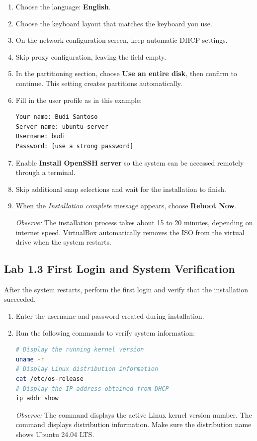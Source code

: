 \begin{enumerate}
    \item Choose the language: \textbf{English}.
    \item Choose the keyboard layout that matches the keyboard you use.
    \item On the network configuration screen, keep automatic DHCP settings.
    \item Skip proxy configuration, leaving the field empty.
    \item In the partitioning section, choose \textbf{Use an entire disk}, then confirm to continue. This setting creates partitions automatically.
    \item Fill in the user profile as in this example:
    \begin{lstlisting}[caption={Example user profile fields}]
Your name: Budi Santoso
Server name: ubuntu-server
Username: budi
Password: [use a strong password]
    \end{lstlisting}
    \item Enable \textbf{Install OpenSSH server} so the system can be accessed remotely through a terminal.
    \item Skip additional snap selections and wait for the installation to finish.
    \item When the \textit{Installation complete} message appears, choose \textbf{Reboot Now}.

    \textit{Observe:} The installation process takes about 15 to 20 minutes, depending on internet speed. VirtualBox automatically removes the ISO from the virtual drive when the system restarts.
\end{enumerate}

\subsection*{Lab 1.3 First Login and System Verification}

After the system restarts, perform the first login and verify that the installation succeeded.

\begin{enumerate}
    \item Enter the username and password created during installation.
    \item Run the following commands to verify system information:

    \begin{lstlisting}[language=bash, caption={Verifying system information}]
# Display the running kernel version
uname -r
# Display Linux distribution information
cat /etc/os-release
# Display the IP address obtained from DHCP
ip addr show
    \end{lstlisting}

    \textit{Observe:} The  command displays the active Linux kernel version number. The  command displays distribution information. Make sure the distribution name shows Ubuntu 24.04 LTS.
\end{enumerate}

